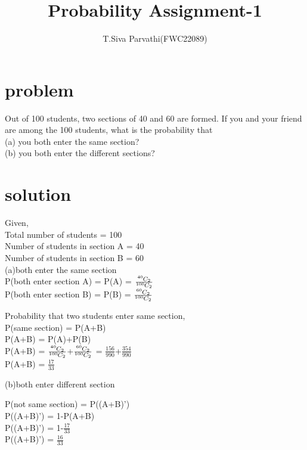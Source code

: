 \documentclass[journal,12pt,twocolumn]{IEEEtran}
\title{\mytitle}
\title{
Probability Assignment-1
}
\author{T.Siva Parvathi(FWC22089)}
\newcommand*{\permcomb}[4][0mu]{{{}^{#3}\mkern#1#2_{#4}}}
\newcommand*{\comb}[1][-1mu]{\permcomb[#1]{C}}
\begin{document}
\maketitle
\tableofcontents
\bigskip


\section{\textbf{problem}}

Out of 100 students, two sections of 40 and 60 are formed. If you and your friend are among the 100 students, what is the probability that\\(a) you both enter the same section?\\(b) you both enter the different sections?
\section{\textbf{solution}}
Given, \\Total number of students = 100\\
Number of students in section A = 40\\
Number of students in section B = 60\\

(a)both enter the same section\\

P(both enter section A) = P(A) = $\frac{\comb{40}{2}} {\comb{100}{2}}$\\
P(both enter section B) = P(B) = $\frac{\comb{60}{2}} {\comb{100}{2}}$
\begin{center}
Probability that two students enter same section,\\
P(same section) = P(A+B) \\
P(A+B) = P(A)+P(B)\\
P(A+B) = $\frac{\comb{40}{2}}{\comb{100}{2}}$+$\frac{\comb{60}{2}}{\comb{100}{2}}$ = $\frac{156}{990}$+$\frac{354}{990}$\\
P(A+B) = $\frac{17}{33}$
\end{center}
(b)both enter different section\\
\begin{center}
P(not same section) = P((A+B)') \\
P((A+B)') = 1-P(A+B)\\
P((A+B)') = 1-$\frac{17}{33}$\\
P((A+B)') = $\frac{16}{33}$
\end{center}
\end{document}
